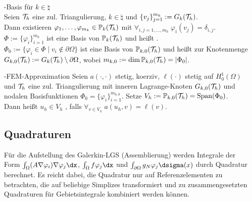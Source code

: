 \begin{Satz}{-Basis für $k \in \natural$}\\
    Seien $\mathcal{T}_h$ eine zul. Triangulierung, $k \in \natural$ und
    $\{v_j\}_{j=1}^{m_k} := G_k(\mathcal{T}_h)$.\\
    Dann existieren $\varphi_1, \dotsc, \varphi_{m_k} \in \mathbb{P}_k(\mathcal{T}_h)$
    mit $\forall_{i,j=1,\dotsc,m_k}\; \varphi_i(v_j) = \delta_{i,j}$.\\
    $\Phi := \{\varphi_i\}_{i=1}^{m_k}$ ist eine Basis von $\mathbb{P}_k(\mathcal{T}_h)$ und heißt
    .\\
    $\Phi_0 := \{\varphi_i \in \Phi \;|\; v_i \notin \partial\Omega\}$
    ist eine Basis von $\mathbb{P}_{k,0}(\mathcal{T}_h)$ und heißt
     zur Knotenmenge
    $G_{k,0}(\mathcal{T}_h) := G_k(\mathcal{T}_h) \setminus \partial\Omega$,
    wobei $m_{k,0} := \dim \mathbb{P}_{k,0}(\mathcal{T}_h) = |\Phi_0|$.
\end{Satz}

\begin{Def}{-FEM-Approximation}
    Seien $a(\cdot, \cdot)$ stetig, koerziv,
    $\ell(\cdot)$ stetig auf $H^1_0(\Omega)$ und
    $\mathcal{T}_h$ eine zul. Triangulierung mit inneren Lagrange-Knoten $G_{k,0}(\mathcal{T}_h)$
    und nodalen Basisfunktionen $\Phi_0 = \{\varphi_i\}_{i=1}^{m_{k,0}}$.
    Setze $V_h := \mathbb{P}_{k,0}(\mathcal{T}_h) = \operatorname{Span}(\Phi_0)$.\\
    Dann heißt $u_h \in V_h$ ,
    falls $\forall_{v \in V_h}\; a(u_h, v) = \ell(v)$.
\end{Def}

\pagebreak

\subsection{%
    Quadraturen%
}

\begin{Bem}
    Für die Aufstellung des Galerkin-LGS (Assemblierung) werden Integrale der Form
    $\int_\Omega (A\nabla \varphi_i) \nabla \varphi_j \dx$,
    $\int_\Omega f\varphi_j \dx$ und $\int_{\partial\Omega} g_N \varphi_j \dsigma(x)$
    durch Quadratur berechnet.
    Es reicht dabei, die Quadratur nur auf Referenzelementen zu betrachten,
    die auf beliebige Simplizes transformiert und zu zusammengesetzten
    Quadraturen für Gebietsintegrale kombiniert werden können.
\end{Bem}

